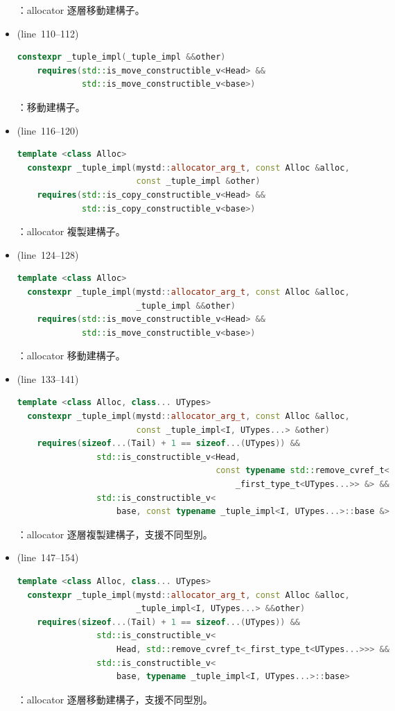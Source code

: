 \documentclass[a4paper,12pt]{article}
\begin{document}
\begin{itemize}
：allocator 逐層移動建構子。
\item (line~110--112)
\begin{lstlisting}[language=C++]
  constexpr _tuple_impl(_tuple_impl &&other)
    requires(std::is_move_constructible_v<Head> &&
             std::is_move_constructible_v<base>)
\end{lstlisting}
：移動建構子。
\item (line~116--120)
\begin{lstlisting}[language=C++]
  template <class Alloc>
  constexpr _tuple_impl(mystd::allocator_arg_t, const Alloc &alloc,
                        const _tuple_impl &other)
    requires(std::is_copy_constructible_v<Head> &&
             std::is_copy_constructible_v<base>)
\end{lstlisting}
：allocator 複製建構子。
\item (line~124--128)
\begin{lstlisting}[language=C++]
  template <class Alloc>
  constexpr _tuple_impl(mystd::allocator_arg_t, const Alloc &alloc,
                        _tuple_impl &&other)
    requires(std::is_move_constructible_v<Head> &&
             std::is_move_constructible_v<base>)
\end{lstlisting}
：allocator 移動建構子。
\item (line~133--141)
\begin{lstlisting}[language=C++]
  template <class Alloc, class... UTypes>
  constexpr _tuple_impl(mystd::allocator_arg_t, const Alloc &alloc,
                        const _tuple_impl<I, UTypes...> &other)
    requires(sizeof...(Tail) + 1 == sizeof...(UTypes)) &&
                std::is_constructible_v<Head,
                                        const typename std::remove_cvref_t<
                                            _first_type_t<UTypes...>> &> &&
                std::is_constructible_v<
                    base, const typename _tuple_impl<I, UTypes...>::base &>
\end{lstlisting}
：allocator 逐層複製建構子，支援不同型別。
\item (line~147--154)
\begin{lstlisting}[language=C++]
  template <class Alloc, class... UTypes>
  constexpr _tuple_impl(mystd::allocator_arg_t, const Alloc &alloc,
                        _tuple_impl<I, UTypes...> &&other)
    requires(sizeof...(Tail) + 1 == sizeof...(UTypes)) &&
                std::is_constructible_v<
                    Head, std::remove_cvref_t<_first_type_t<UTypes...>>> &&
                std::is_constructible_v<
                    base, typename _tuple_impl<I, UTypes...>::base>
\end{lstlisting}
：allocator 逐層移動建構子，支援不同型別。
\end{itemize}
\end{document}
